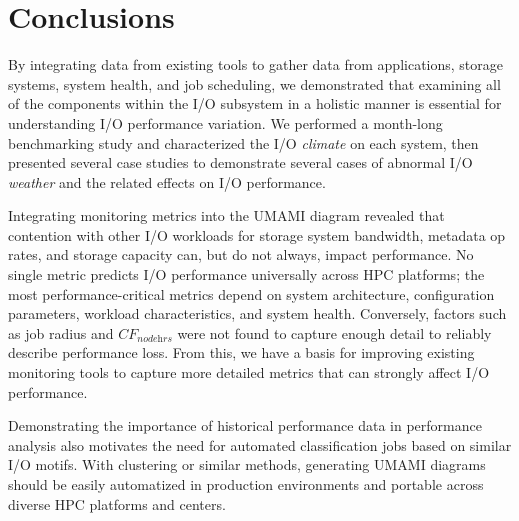 \section{Conclusions} \label{sec:conclusions}

By integrating data from existing tools to gather data from applications, storage systems, system health, and job scheduling, we demonstrated that examining all of the components within the I/O subsystem in a holistic manner is essential for understanding I/O performance variation.
We performed a month-long benchmarking study and characterized the I/O \emph{climate} on each system, then presented several case studies to demonstrate several cases of abnormal I/O \emph{weather} and the related effects on I/O performance.

Integrating monitoring metrics into the UMAMI diagram revealed that contention with other I/O workloads for storage system bandwidth, metadata op rates, and storage capacity can, but do not always, impact performance.
No single metric predicts I/O performance universally across HPC platforms;
the most performance-critical metrics depend on system architecture, configuration parameters, workload characteristics, and system health.
Conversely, factors such as job radius and $\textit{CF}_{\textit{nodehrs}}$ were not found to capture enough detail to reliably describe performance loss.
From this, we have a basis for improving existing monitoring tools to capture more detailed metrics that can strongly affect I/O performance.

Demonstrating the importance of historical performance data in performance analysis also motivates the need for automated classification jobs based on similar I/O motifs.  With  clustering or similar methods, generating UMAMI diagrams should be easily automatized in production environments and portable across diverse HPC platforms and centers.

%
